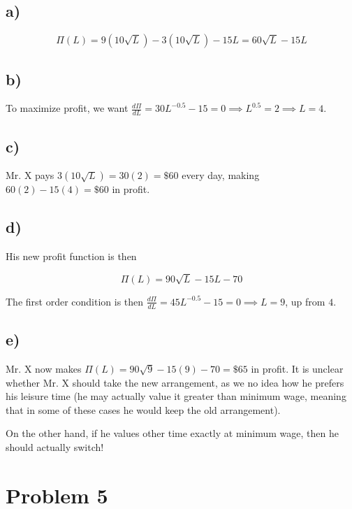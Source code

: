 \documentclass[12pt,letterpaper]{article}
\theoremstyle{definition}
\begin{document}
\subsection*{a)}

\[
  \Pi(L) = 9(10\sqrt{L}) - 3(10\sqrt{L}) - 15L = 60\sqrt{L} - 15L
\]

\subsection*{b)}

To maximize profit, we want $\frac{d\Pi}{dL} = 30L^{-0.5} - 15 = 0 \implies
L^{0.5} = 2 \implies L = 4$.

\subsection*{c)}

Mr. X pays $3(10\sqrt{L}) = 30(2) = \$ 60$ every day, making $60(2)- 15(4) = \$
60$ in profit.

\subsection*{d)}

His new profit function is then

\[
  \Pi(L) = 90\sqrt{L} - 15L - 70
\]

The first order condition is then $\frac{d\Pi}{dL} = 45L^{-0.5} - 15 = 0 \implies
L = 9$, up from $4$.

\subsection*{e)}

Mr. X now makes $\Pi(L) = 90\sqrt{9} - 15(9) - 70 = \$65$ in profit. It is
unclear whether Mr. X should take the new arrangement, as we no idea how he
prefers his leisure time (he may actually value it greater than minimum wage,
meaning that in some of these cases he would keep the old arrangement).


On the other hand, if he values other time exactly at minimum wage, then he should
actually switch!

\section*{Problem 5}
\end{document}
